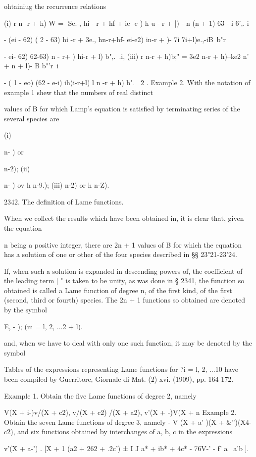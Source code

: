 {{{{ohtainiug the recurrence relations

(i) r n -r + h) W =- Se.-, hi - r + hf + ie -e ) h u - r + |) - n (n +
1) 63 - i 6',.-i

- (ei - 62) ( 2 - 63) hi -r + %
3e., hn-r+hf- ei-e2) in-r + )- 7i 7i+l)e.,-iB\ b"r\,

- ei- 62) 62-63) n - r+ ) hi-r + l) b",.\ .i, (iii) r n-r + h)b;" =
3e2 n-r + h)--ke2 n' + n + l)- B b"'r\ i

- ( 1 - eo) (62 - e-i) ih)i-r+l) l n -r + h) b". \ 2 . Example 2. With
the notation of example 1 shew that the numbers of real distinct

values of B for which Lamp's equation is satisfied by terminating
series of the several species are

(i) \ \ {n- ) or \ \ {n-2); (ii) \ \ {n- ) ov h n-9.); (iii) n-2) or h
n-Z).

2342. The definition of Lame functions.

When we collect the results which have been obtained in, it is
clear that, given the equation

n being a positive integer, there are 2n + 1 values of B for which the
equation has a solution of one or other of the four species described
in §§ 23"21-23'24.

If, when such a solution is expanded in descending powers of, the
coefficient of the leading term | " is taken to be unity, as was done
in § 2341, the function so obtained is called a Lame function of
degree n, of the first kind, of the first (second, third or fourth)
species. The 2n + 1 functions so obtained are denoted by the symbol

E, - ); (m = l, 2, ...2 + l).

and, when we have to deal with only one such function, it may be
denoted by the symbol

Tables of the expressions representing Lame functions for ?i = l, 2,
...10 have been compiled by Guerritore, Giornale di Mat. (2) xvi.
(1909), pp. 164-172.

Example 1. Obtain the five Lame functions of degree 2, namely

V(X + i-)v/(X + c2), v/(X + c2) /(X + a2), v'(X + -)V(X + n Example 2.
Obtain the seven Lame functions of degree 3, namely - V (X + a' )(X +
\&'')(X4-c2), and six functions obtained by interchanges of a, b, c
in the expressions

v'(X + a-') . [X + 1 (a2 + 262 + .2c') ± I J a* + ib* + 4c* - 76V-' -
f' a \ a'b ].

}}}}}}}
